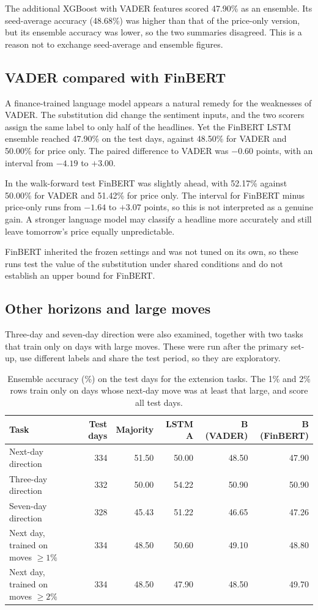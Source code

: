 The additional XGBoost with VADER features scored 47.90\% as an ensemble. Its seed-average accuracy (48.68\%) was higher than that of the price-only version, but its ensemble accuracy was lower, so the two summaries disagreed. This is a reason not to exchange seed-average and ensemble figures.

\subsection{VADER compared with FinBERT}
A finance-trained language model appears a natural remedy for the weaknesses of VADER. The substitution did change the sentiment inputs, and the two scorers assign the same label to only half of the headlines. Yet the FinBERT LSTM ensemble reached 47.90\% on the test days, against 48.50\% for VADER and 50.00\% for price only. The paired difference to VADER was $-0.60$ points, with an interval from $-4.19$ to $+3.00$.

In the walk-forward test FinBERT was slightly ahead, with 52.17\% against 50.00\% for VADER and 51.42\% for price only. The interval for FinBERT minus price-only runs from $-1.64$ to $+3.07$ points, so this is not interpreted as a genuine gain. A stronger language model may classify a headline more accurately and still leave tomorrow's price equally unpredictable.

FinBERT inherited the frozen settings and was not tuned on its own, so these runs test the value of the substitution under shared conditions and do not establish an upper bound for FinBERT.

\subsection{Other horizons and large moves}
Three-day and seven-day direction were also examined, together with two tasks that train only on days with large moves. These were run after the primary set-up, use different labels and share the test period, so they are exploratory.

\begin{table}[htbp]\centering\small
\caption{Ensemble accuracy (\%) on the test days for the extension tasks. The 1\% and 2\% rows train only on days whose next-day move was at least that large, and score all test days.}\label{tab:extensions}
\begin{tabularx}{\textwidth}{Xrrrrr}
\toprule
Task & Test days & Majority & LSTM A & B (VADER) & B (FinBERT)\\\midrule
Next-day direction & 334 & 51.50 & 50.00 & 48.50 & 47.90\\
Three-day direction & 332 & 50.00 & 54.22 & 50.90 & 50.90\\
Seven-day direction & 328 & 45.43 & 51.22 & 46.65 & 47.26\\
Next day, trained on moves $\geq1\%$ & 334 & 48.50 & 50.60 & 49.10 & 48.80\\
Next day, trained on moves $\geq2\%$ & 334 & 48.50 & 47.90 & 48.50 & 49.70\\
\bottomrule
\end{tabularx}
\end{table}

